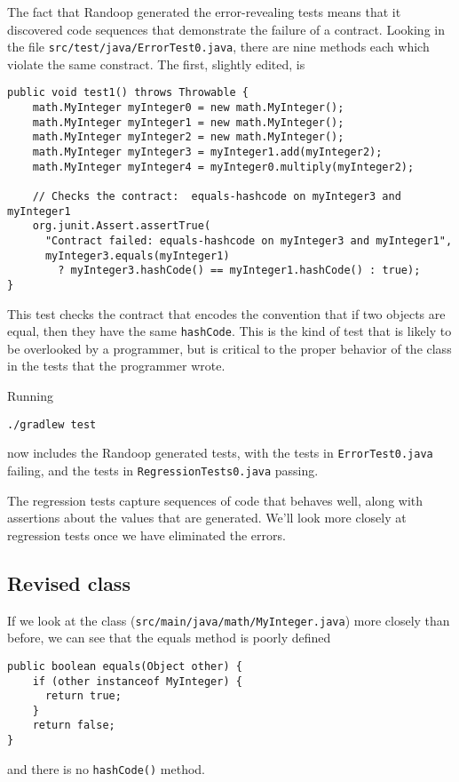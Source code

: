 \documentclass[11pt, oneside]{article} %
\newcommand{\code}[1]{{\texttt{#1}}}
\begin{document}
The fact that Randoop generated the error-revealing tests means that it discovered code sequences that demonstrate the failure of a contract.
Looking in the file \texttt{src/test/java/ErrorTest0.java}, there are nine methods each which violate the same constract.
The first, slightly edited, is
\begin{verbatim}
public void test1() throws Throwable {
    math.MyInteger myInteger0 = new math.MyInteger();
    math.MyInteger myInteger1 = new math.MyInteger();
    math.MyInteger myInteger2 = new math.MyInteger();
    math.MyInteger myInteger3 = myInteger1.add(myInteger2);
    math.MyInteger myInteger4 = myInteger0.multiply(myInteger2);
    
    // Checks the contract:  equals-hashcode on myInteger3 and myInteger1
    org.junit.Assert.assertTrue(
      "Contract failed: equals-hashcode on myInteger3 and myInteger1", 
      myInteger3.equals(myInteger1) 
        ? myInteger3.hashCode() == myInteger1.hashCode() : true);
}
\end{verbatim}
This test checks the contract that encodes the convention that if two objects are equal, then they have the same \code{hashCode}.
This is the kind of test that is likely to be overlooked by a programmer, but is critical to the proper behavior of the class in the tests that the programmer wrote.

\vfill\pagebreak
Running 
\begin{verbatim}
./gradlew test
\end{verbatim}
now includes the Randoop generated tests, with the tests in \texttt{ErrorTest0.java} failing, and the tests in \texttt{RegressionTests0.java} passing.


The regression tests capture sequences of code that behaves well, along with assertions about the values that are generated. 
We'll look more closely at regression tests once we have eliminated the errors.

\subsection{Revised class}

If we look at the class (\texttt{src/main/java/math/MyInteger.java}) more closely than before, we can see that the equals method is poorly defined
\begin{verbatim}
public boolean equals(Object other) {
    if (other instanceof MyInteger) {
      return true;
    }
    return false;
}
\end{verbatim}
and there is no \code{hashCode()} method.
\end{document}
